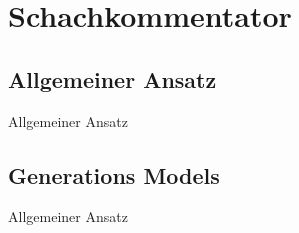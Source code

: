 \section{Schachkommentator}

\subsection{Allgemeiner Ansatz}

\begin{frame}{Allgemeiner Ansatz}

\end{frame}

\subsection{Generations Models}

\begin{frame}{Allgemeiner Ansatz}

\end{frame}
